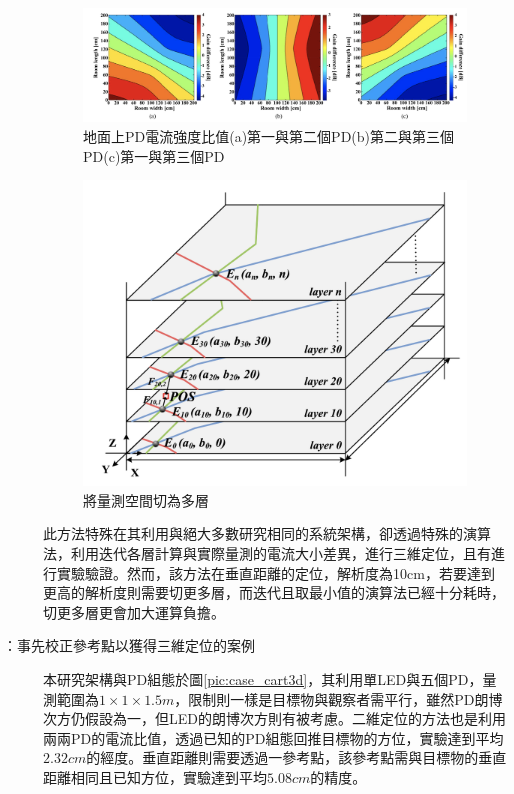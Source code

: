 \begin{description}
        \begin{figure}[h]
            \centering
            \includegraphics[width=12cm]{ch2pic/layers_2d.png}
            \caption{地面上PD電流強度比值(a)第一與第二個PD(b)第二與第三個PD(c)第一與第三個PD\cite{case:3d_layers}}
            \label{pic:layers_2d}
        \end{figure}

        \begin{figure}[h]
            \centering
            \includegraphics[width=12cm]{ch2pic/layers_3d.png}
            \caption{\cite{case:3d_layers}將量測空間切為多層}
            \label{pic:layers_3d}
        \end{figure}

        \qquad
        此方法特殊在其利用與絕大多數研究相同的系統架構，卻透過特殊的演算法，利用迭代各層計算與實際量測的電流大小差異，進行三維定位，且有進行實驗驗證。然而，該方法在垂直距離的定位，解析度為10cm，若要達到更高的解析度則需要切更多層，而迭代且取最小值的演算法已經十分耗時，切更多層更會加大運算負擔。

        \item[\cite{case:cart3d}：事先校正參考點以獲得三維定位的案例] \hfill 
        
        \qquad
        本研究架構與PD組態於圖\ref{pic:case_cart3d}，其利用單LED與五個PD，量測範圍為$1\times 1\times 1.5m$，限制則一樣是目標物與觀察者需平行，雖然PD朗博次方仍假設為一，但LED的朗博次方則有被考慮。二維定位的方法也是利用兩兩PD的電流比值，透過已知的PD組態回推目標物的方位，實驗達到平均$2.32cm$的經度。垂直距離則需要透過一參考點，該參考點需與目標物的垂直距離相同且已知方位，實驗達到平均$5.08cm$的精度。


\end{description}
